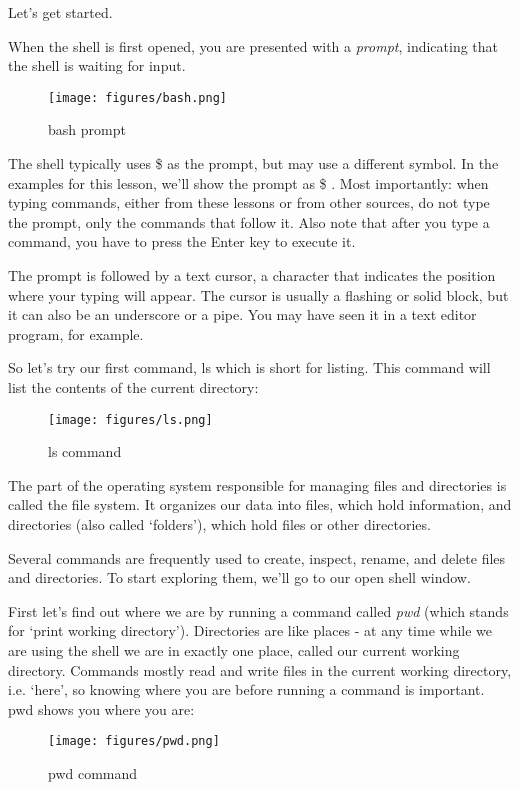 \documentclass[11pt]{book}
\begin{document}
Let’s get started.

When the shell is first opened, you are presented with a \emph{prompt}, indicating that the shell is waiting for input.

\begin{figure}
\texttt{[image: figures/bash.png]}
\caption{bash prompt}
\end{figure}

The shell typically uses \$ as the prompt, but may use a different symbol. In the examples for this lesson, we’ll show the prompt as \$ . Most importantly: when typing commands, either from these lessons or from other sources, do not type the prompt, only the commands that follow it. Also note that after you type a command, you have to press the Enter key to execute it.

The prompt is followed by a text cursor, a character that indicates the position where your typing will appear. The cursor is usually a flashing or solid block, but it can also be an underscore or a pipe. You may have seen it in a text editor program, for example.

So let’s try our first command, ls which is short for listing. This command will list the contents of the current directory:

\begin{figure}[!]
\texttt{[image: figures/ls.png]}
\caption{ls command}
\end{figure}



The part of the operating system responsible for managing files and directories is called the file system. It organizes our data into files, which hold information, and directories (also called ‘folders’), which hold files or other directories.

Several commands are frequently used to create, inspect, rename, and delete files and directories. To start exploring them, we’ll go to our open shell window.

First let’s find out where we are by running a command called \emph{pwd} (which stands for ‘print working directory’). Directories are like places - at any time while we are using the shell we are in exactly one place, called our current working directory. Commands mostly read and write files in the current working directory, i.e. ‘here’, so knowing where you are before running a command is important. pwd shows you where you are:

\begin{figure}[!]
\texttt{[image: figures/pwd.png]}
\caption{pwd command}
\end{figure}
\end{document}
